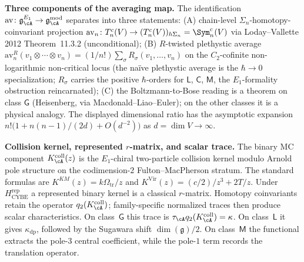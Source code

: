 \smallskip\noindent\textbf{Three components of the averaging map.}
The identification $\mathrm{av}\colon\gAE\to\gAmod$ separates into
three statements: (A) chain-level $\Sigma_n$-homotopy-coinvariant
projection
$\mathrm{av}_n\colon T^c_n(V)\to (T^c_n(V))_{h\Sigma_n}=\Sym^c_n(V)$
via Loday--Vallette 2012 Theorem~11.3.2 (unconditional);
(B) $R$-twisted plethystic average
$\mathrm{av}_n^R(v_1\otimes\cdots\otimes v_n) =
(1/n!)\sum_\sigma R_\sigma(v_1,\dots,v_n)$ on the $C_2$-cofinite
non-logarithmic non-critical locus (the na\"ive plethystic average is
the $\hbar\to0$ specialization; $R_\sigma$ carries the positive
$\hbar$-orders for $\mathsf L$, $\mathsf C$, $\mathsf M$, the
$E_1$-formality obstruction reincarnated);
(C) the Boltzmann-to-Bose reading is a theorem on class $\mathsf G$
(Heisenberg, via Macdonald--Liao--Euler); on the other classes it is a
physical analogy. The displayed dimensional ratio has the asymptotic
expansion
$n!\bigl(1+n(n-1)/(2d)+O(d^{-2})\bigr)$ as $d=\dim V\to\infty$.

\smallskip\noindent\textbf{Collision kernel, represented $r$-matrix,
and scalar trace.}
The binary MC component
$K_\cA^{\mathrm{coll}}(z)$ is the $E_1$-chiral two-particle collision
kernel modulo Arnold pole structure on the codimension-$2$
Fulton--MacPherson stratum.  The standard formulas are
$K^{KM}(z)=k\Omega_{\mathrm{tr}}/z$ and
$K^{\mathrm{Vir}}(z)=(c/2)/z^3+2T/z$.  Under
$H_{\mathrm{CYBE}}^{\mathrm{rep}}$ a represented binary kernel is a
classical $r$-matrix.  Homotopy coinvariants retain the operator
$q_2(K_\cA^{\mathrm{coll}})$; family-specific normalized traces then
produce scalar characteristics.  On class~$\mathsf G$ this trace is
$\tau_\cA q_2(K_\cA^{\mathrm{coll}})=\kappa$.  On class~$\mathsf L$
it gives $\kappa_{\mathrm{dp}}$, followed by the Sugawara shift
$\dim(\mathfrak g)/2$.  On class~$\mathsf M$ the functional extracts
the pole-$3$ central coefficient, while the pole-$1$ term records the
translation operator.

